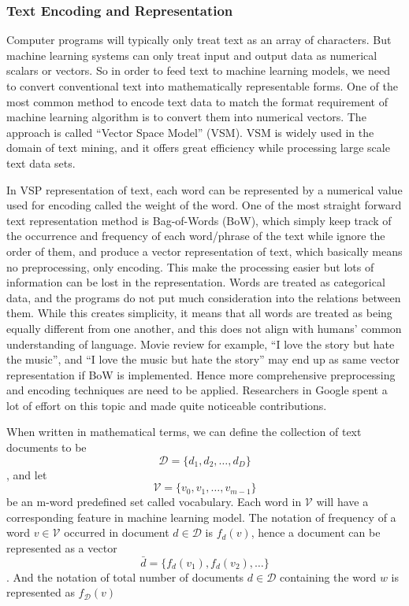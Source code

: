 \documentclass[conference]{IEEEtran}
\begin{document}
\subsubsection{Text Encoding and Representation}
\label{model:represent:encoding}
    Computer programs will typically only treat text as an array of characters.
    But machine learning systems can only treat input and output data as numerical
    scalars or vectors. So in order to feed text to machine learning models, we need to
    convert conventional text into mathematically representable forms. One of the most
    common method to encode text data to match the format requirement of machine
    learning algorithm is to convert them into numerical vectors. The approach is called
    ``Vector Space Model'' (VSM). VSM is widely used in the domain of text mining, and
    it offers great efficiency while processing large scale text data
    sets\cite{salton1975vector,hotho2005brief}.

    In VSP representation of text, each word can be represented by a numerical value
    used for encoding called the weight of the word.
    One of the most straight forward text representation method is Bag-of-Words (BoW),
    which simply keep track of the occurrence and frequency of each word/phrase of the text
    while ignore the order of them, and produce a vector representation of text, which
    basically means no preprocessing, only encoding.
    This make the processing easier but lots of information can be lost in the
    representation.
    Words are treated as categorical data, and the programs do not put much consideration
    into the relations between them. While this creates simplicity, it means that all
    words are treated as being equally different from one another, and this does not
    align with humans' common understanding of language.
    Movie review for example, ``I love the story but hate the music'',
    and ``I love the music but hate the story'' may end up as same vector representation
    if BoW is implemented. Hence more comprehensive preprocessing and encoding techniques
    are need to be applied.
    Researchers in Google spent a lot of effort on this topic and
    made quite noticeable contributions\cite{mikolov2013efficient, word2vec}.

    When written in mathematical terms, we can define the collection of text documents
    to be $$\mathcal{D}=\{d_1, d_2,\ldots,d_D\}$$, and
    let $$\mathcal{V}=\{v_0, v_1,\ldots, v_{m-1}\}$$ be an m-word predefined set called
    vocabulary. Each word in $\mathcal{V}$ will have a corresponding feature in
    machine learning model. The notation of frequency of a word $v\in\mathcal{V}$ occurred
    in document $d\in\mathcal{D}$ is $f_d(v)$, hence a document can be represented as
    a vector $$\bar{d}=\{f_d(v_1),f_d(v_2),\ldots\}$$.
    And the notation of total number of documents
    $d\in\mathcal{D}$ containing the word $w$ is represented as $f_\mathcal{D}(v)$
\end{document}
